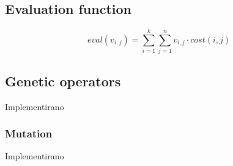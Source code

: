 \documentclass[12pt,a4paper,twoside]{article}
\theoremstyle{definition} %
\theoremstyle{plain} %
\numberwithin{equation}{section}  %
\begin{document}
\subsection{Evaluation function}

$$eval(v_{i,j}) = \sum\limits_{i=1}^{k} \sum\limits_{j=1}^{n} v_{i,j} \cdot cost(i,j)$$

\subsection{Genetic operators}

Implementirano

\subsubsection{Mutation}

Implementirano
\end{document}
